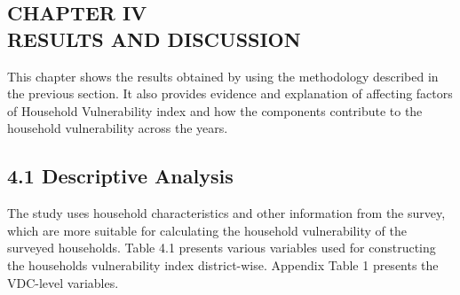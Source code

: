 \clearpage
\begin{center}
	\section*{\large{CHAPTER IV \\ \vspace{-0.3cm} RESULTS AND DISCUSSION}}
\end{center}
\renewcommand{\thepage}{\arabic{page}}
This chapter shows the results obtained by using the methodology described in the
previous section. It also provides evidence and explanation of affecting factors of
Household Vulnerability index and how the components contribute to the household vulnerability across the years. \\


\subsection*{4.1 Descriptive Analysis}
\renewcommand{\thepage}{\arabic{page}}
The study uses household characteristics and other information from
the survey, which are more suitable for calculating the household vulnerability of the surveyed households. Table 4.1 presents various variables used for constructing the households vulnerability index district-wise. Appendix Table 1 presents the VDC-level variables.   

